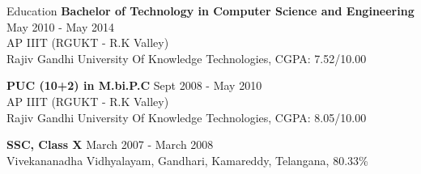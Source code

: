 \documentclass{resume} %
\begin{document}

\begin{rSection}{Education}
  {\bf Bachelor of Technology in Computer Science and Engineering} \hfill {May 2010 - May 2014}
  \\ 
  AP IIIT (RGUKT - R.K Valley)
  \\
  Rajiv Gandhi University Of Knowledge Technologies,  CGPA: 7.52/10.00  
  
  {\bf PUC (10+2) in M.bi.P.C} \hfill {Sept 2008 - May 2010}
  \\
  AP IIIT (RGUKT - R.K Valley)
  \\
  Rajiv Gandhi University Of Knowledge Technologies,  CGPA: 8.05/10.00  
  
  {\textbf{SSC, Class X}}  \hfill March 2007 - March  2008 \\
  Vivekananadha Vidhyalayam, Gandhari, Kamareddy, Telangana, 80.33\% 

\end{rSection}

\end{document}
